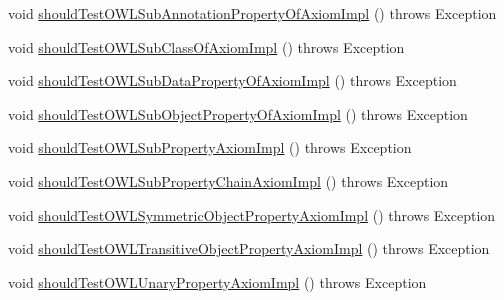 \begin{DoxyCompactItemize}
\item 
void \hyperlink{classorg_1_1semanticweb_1_1owlapi_1_1contract_1_1_contract_owlapi__3_test_af3026eb5348d86151e9bd6d7b7940a0b}{should\-Test\-O\-W\-L\-Sub\-Annotation\-Property\-Of\-Axiom\-Impl} ()  throws Exception 
\item 
void \hyperlink{classorg_1_1semanticweb_1_1owlapi_1_1contract_1_1_contract_owlapi__3_test_aa933653dcd83eca2c6c2196dea665f9b}{should\-Test\-O\-W\-L\-Sub\-Class\-Of\-Axiom\-Impl} ()  throws Exception 
\item 
void \hyperlink{classorg_1_1semanticweb_1_1owlapi_1_1contract_1_1_contract_owlapi__3_test_a2c71c8ea8f0ad1c18e46dbed2e410ffa}{should\-Test\-O\-W\-L\-Sub\-Data\-Property\-Of\-Axiom\-Impl} ()  throws Exception 
\item 
void \hyperlink{classorg_1_1semanticweb_1_1owlapi_1_1contract_1_1_contract_owlapi__3_test_a40dd7d1c9424d0a8e4ce404f0e743954}{should\-Test\-O\-W\-L\-Sub\-Object\-Property\-Of\-Axiom\-Impl} ()  throws Exception 
\item 
void \hyperlink{classorg_1_1semanticweb_1_1owlapi_1_1contract_1_1_contract_owlapi__3_test_ae0b10d258161ca8b1e9bcdaeb6adb19e}{should\-Test\-O\-W\-L\-Sub\-Property\-Axiom\-Impl} ()  throws Exception 
\item 
void \hyperlink{classorg_1_1semanticweb_1_1owlapi_1_1contract_1_1_contract_owlapi__3_test_a3099fe2f77fb694af2aef5a713d537a9}{should\-Test\-O\-W\-L\-Sub\-Property\-Chain\-Axiom\-Impl} ()  throws Exception 
\item 
void \hyperlink{classorg_1_1semanticweb_1_1owlapi_1_1contract_1_1_contract_owlapi__3_test_aff9f38cfeabe54b412579b7a89f9ca05}{should\-Test\-O\-W\-L\-Symmetric\-Object\-Property\-Axiom\-Impl} ()  throws Exception 
\item 
void \hyperlink{classorg_1_1semanticweb_1_1owlapi_1_1contract_1_1_contract_owlapi__3_test_a3178864bfaa0bf21fcc1854a5012c0af}{should\-Test\-O\-W\-L\-Transitive\-Object\-Property\-Axiom\-Impl} ()  throws Exception 
\item 
void \hyperlink{classorg_1_1semanticweb_1_1owlapi_1_1contract_1_1_contract_owlapi__3_test_a448b75c12a927f8a1184e50e81f7e9d0}{should\-Test\-O\-W\-L\-Unary\-Property\-Axiom\-Impl} ()  throws Exception 
\end{DoxyCompactItemize}



